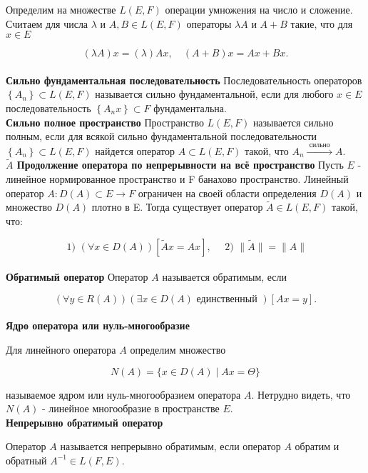Определим на множестве $L(E, F)$ операции умножения на число и сложение. Считаем для числа $\lambda$ и $A, B \in L(E, F)$ операторы $\lambda A$ и $A+B$ такие, что для $x \in E$

$$
	(\lambda A) x=(\lambda) A x, \quad(A+B) x=A x+B x .
$$\\

\textbf{Сильно фундаментальная последовательность}
Последовательность операторов $\left\{A_{n}\right\} \subset L(E, F)$ называется сильно фундаментальной, если для любого $x \in E$ последовательность $\left\{A_{n} x\right\} \subset F$ фундаментальна.\\

\textbf{Сильно полное пространство}
Пространство $L(E, F)$ называется сильно полным, если для всякой сильно фундаментальной последовательности $\left\{A_{n}\right\} \subset L(E, F)$ найдется оператор $A \subset L(E, F)$ такой, что $A_{n} \stackrel{\text { сильно }}{\longrightarrow} A$.\\

\textbf{$\widetilde{A}$ Продолжение оператора по непрерывности на всё пространство}
Пусть $E$ - линейное нормированное пространство и F банахово пространство. Линейный оператор $A: D(A) \subset E \rightarrow F$ ограничен на своей области определения $D(A)$ и множество $D(A)$ плотно в E. Тогда существует оператор $\widetilde{A} \in L(E, F)$ такой, что:

$$
\text { 1) }(\forall x \in D(A))[\widetilde{A} x=A x], \quad \text { 2) }\|\widetilde{A}\|=\|A\|
$$\\

\textbf{Обратимый оператор}
Оператор $A$ называется обратимым, если

$$
(\forall y \in R(A))(\exists x \in D(A) \text { единственный })[A x=y] .
$$\\

\textbf{Ядро оператора или нуль-многообразие}

Для линейного оператора $A$ определим множество

$$
N(A)=\{x \in D(A) \mid A x=\Theta\}
$$

называемое ядром или нуль-многообразием оператора $A$. Нетрудно видеть, что $N(A)$ - линейное многообразие в пространстве $E$.\\

\textbf{Непрерывно обратимый оператор}

Оператор $A$ называется непрерывно обратимым, если оператор $A$ обратим и обратный $A^{-1} \in L(F, E)$.

